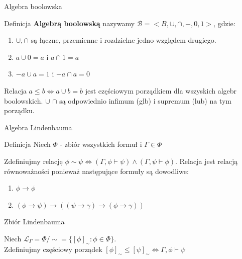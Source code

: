\documentclass{beamer}
\begin{document}
\begin{frame}{Algebra boolowska}
 \begin{block}{Definicja}
 \textbf{Algebrą boolowską} nazywamy \( \mathcal{B}  = < B, \cup, \cap, -, 0, 1 >\), gdzie: 
 \begin{enumerate}
 \item \(\cup, \cap\) są łączne, przemienne i rozdzielne jedno względem drugiego.
 \item \( a \cup 0 = a \) i \( a \cap 1 = a \) 
 \item \( -a \cup a = 1 \) i \( -a \cap a  =  0 \)
 \end{enumerate}
 Relacja \(a \leq b  \Leftrightarrow  a \cup b = b \) jest częściowym porządkiem dla wszyskich algebr boolowskich. \( \cup \) \( \cap \) są odpowiednio infimum (glb) i supremum (lub) na tym porządku.
 \end{block}
 
\end{frame}

\begin{frame}{Algebra Lindenbauma}
 \begin{block}{Definicja}
 Niech \( \Phi \) - zbiór wszystkich formuł i \( \Gamma \in \Phi \) 
 
 Zdefiniujmy relację  \( \phi \sim \psi \Leftrightarrow (\Gamma, \phi  \vdash \psi) \wedge (\Gamma, \psi \vdash \phi) \).
 Relacja jest relacją równoważności ponieważ następujące formuły są dowodliwe: 
 \begin{enumerate}
 \item \(\phi \rightarrow \phi\)
 \item \((\phi \rightarrow \psi) \rightarrow (( \psi \rightarrow  \gamma ) \rightarrow ( \phi \rightarrow \gamma ))  \) 
 \end{enumerate}
 \end{block}
 
 \begin{block}{Zbiór Lindenbauma}
 
 Niech \( \mathcal{L}_{\Gamma} = \Phi / \sim  = \{ [\phi]_{\sim} :  \phi \in \Phi \}\). \\
 Zdefiniujmy częściowy porządek \( [\phi]_{\sim} \leq [\psi]_{\sim} \Leftrightarrow \Gamma, \phi \vdash \psi \)

 \end{block}
 
\end{frame}
\end{document}

